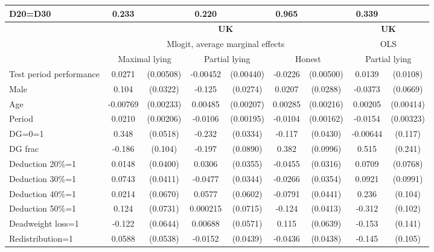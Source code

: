 \begin{tabular}{l|cccccc|cc}
D20=D30         &    0.233         &         &    0.220         &         &    0.965         &         &    0.339         &         \\
\hline\hline
&\multicolumn{6}{c|}{\bf UK}&\multicolumn{2}{c}{\bf UK}\\ &\multicolumn{6}{c|}{Mlogit, average marginal effects }&\multicolumn{2}{c}{OLS}\\
                &\multicolumn{2}{c}{Maximal lying}&\multicolumn{2}{c}{Partial lying}&\multicolumn{2}{c}{Honest}  &\multicolumn{2}{c}{Partial lying}\\
\hline
Test period performance&   0.0271\sym{***}&(0.00508)& -0.00452         &(0.00440)&  -0.0226\sym{***}&(0.00500)&   0.0139         & (0.0108)\\
Male            &    0.104\sym{***}& (0.0322)&   -0.125\sym{***}& (0.0274)&   0.0207         & (0.0288)&  -0.0373         & (0.0669)\\
Age             & -0.00769\sym{***}&(0.00233)&  0.00485\sym{**} &(0.00207)&  0.00285         &(0.00216)&  0.00205         &(0.00414)\\
Period          &   0.0210\sym{***}&(0.00206)&  -0.0106\sym{***}&(0.00195)&  -0.0104\sym{***}&(0.00162)&  -0.0154\sym{***}&(0.00323)\\
DG=0=1          &    0.348\sym{***}& (0.0518)&   -0.232\sym{***}& (0.0334)&   -0.117\sym{***}& (0.0430)& -0.00644         &  (0.117)\\
DG frac         &   -0.186\sym{*}  &  (0.104)&   -0.197\sym{**} & (0.0890)&    0.382\sym{***}& (0.0996)&    0.515\sym{**} &  (0.241)\\
Deduction 20\%=1&   0.0148         & (0.0400)&   0.0306         & (0.0355)&  -0.0455         & (0.0316)&   0.0709         & (0.0768)\\
Deduction 30\%=1&   0.0743\sym{*}  & (0.0411)&  -0.0477         & (0.0344)&  -0.0266         & (0.0354)&   0.0921         & (0.0991)\\
Deduction 40\%=1&   0.0214         & (0.0670)&   0.0577         & (0.0602)&  -0.0791\sym{*}  & (0.0441)&    0.236\sym{**} &  (0.104)\\
Deduction 50\%=1&    0.124\sym{*}  & (0.0731)& 0.000215         & (0.0715)&   -0.124\sym{***}& (0.0413)&   -0.312\sym{***}&  (0.102)\\
Deadweight loss=1&   -0.122\sym{*}  & (0.0644)&  0.00688         & (0.0571)&    0.115\sym{*}  & (0.0639)&   -0.153         &  (0.141)\\
Redistribution=1&   0.0588         & (0.0538)&  -0.0152         & (0.0439)&  -0.0436         & (0.0438)&   -0.145         &  (0.105)\\

\end{tabular}
